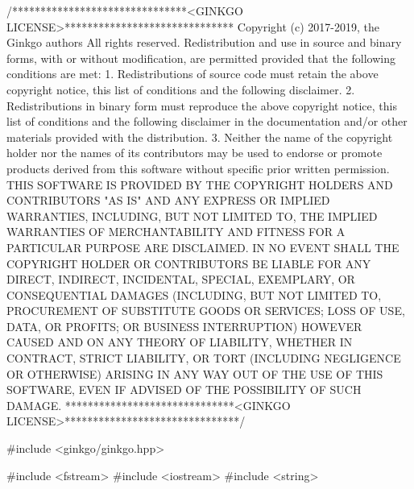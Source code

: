\begin{DoxyCodeInclude}
\textcolor{comment}{/*******************************<GINKGO LICENSE>******************************}
\textcolor{comment}{Copyright (c) 2017-2019, the Ginkgo authors}
\textcolor{comment}{All rights reserved.}
\textcolor{comment}{}
\textcolor{comment}{Redistribution and use in source and binary forms, with or without}
\textcolor{comment}{modification, are permitted provided that the following conditions}
\textcolor{comment}{are met:}
\textcolor{comment}{}
\textcolor{comment}{1. Redistributions of source code must retain the above copyright}
\textcolor{comment}{notice, this list of conditions and the following disclaimer.}
\textcolor{comment}{}
\textcolor{comment}{2. Redistributions in binary form must reproduce the above copyright}
\textcolor{comment}{notice, this list of conditions and the following disclaimer in the}
\textcolor{comment}{documentation and/or other materials provided with the distribution.}
\textcolor{comment}{}
\textcolor{comment}{3. Neither the name of the copyright holder nor the names of its}
\textcolor{comment}{contributors may be used to endorse or promote products derived from}
\textcolor{comment}{this software without specific prior written permission.}
\textcolor{comment}{}
\textcolor{comment}{THIS SOFTWARE IS PROVIDED BY THE COPYRIGHT HOLDERS AND CONTRIBUTORS "AS}
\textcolor{comment}{IS" AND ANY EXPRESS OR IMPLIED WARRANTIES, INCLUDING, BUT NOT LIMITED}
\textcolor{comment}{TO, THE IMPLIED WARRANTIES OF MERCHANTABILITY AND FITNESS FOR A}
\textcolor{comment}{PARTICULAR PURPOSE ARE DISCLAIMED. IN NO EVENT SHALL THE COPYRIGHT}
\textcolor{comment}{HOLDER OR CONTRIBUTORS BE LIABLE FOR ANY DIRECT, INDIRECT, INCIDENTAL,}
\textcolor{comment}{SPECIAL, EXEMPLARY, OR CONSEQUENTIAL DAMAGES (INCLUDING, BUT NOT}
\textcolor{comment}{LIMITED TO, PROCUREMENT OF SUBSTITUTE GOODS OR SERVICES; LOSS OF USE,}
\textcolor{comment}{DATA, OR PROFITS; OR BUSINESS INTERRUPTION) HOWEVER CAUSED AND ON ANY}
\textcolor{comment}{THEORY OF LIABILITY, WHETHER IN CONTRACT, STRICT LIABILITY, OR TORT}
\textcolor{comment}{(INCLUDING NEGLIGENCE OR OTHERWISE) ARISING IN ANY WAY OUT OF THE USE}
\textcolor{comment}{OF THIS SOFTWARE, EVEN IF ADVISED OF THE POSSIBILITY OF SUCH DAMAGE.}
\textcolor{comment}{******************************<GINKGO LICENSE>*******************************/}


\textcolor{preprocessor}{#include <ginkgo/ginkgo.hpp>}

\textcolor{preprocessor}{#include <fstream>}
\textcolor{preprocessor}{#include <iostream>}
\textcolor{preprocessor}{#include <string>}



\end{DoxyCodeInclude}

